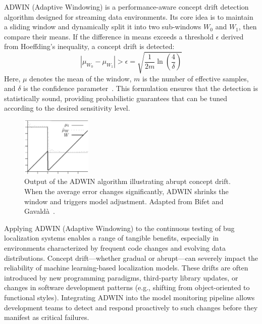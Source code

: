 \documentclass[manuscript,screen,review]{acmart}
\begin{document}
ADWIN (Adaptive Windowing) is a performance-aware concept drift detection algorithm designed for streaming data environments. Its core idea is to maintain a sliding window and dynamically split it into two sub-windows \( W_0 \) and \( W_1 \), then compare their means. If the difference in means exceeds a threshold \( \epsilon \) derived from Hoeffding’s inequality, a concept drift is detected:
\[
\left| \mu_{W_0} - \mu_{W_1} \right| > \epsilon = \sqrt{ \frac{1}{2m} \ln \left( \frac{4}{\delta} \right) }
\]
Here, \( \mu \) denotes the mean of the window, \( m \) is the number of effective samples, and \( \delta \) is the confidence parameter~\cite{Bifet2007}.
This formulation ensures that the detection is statistically sound, providing probabilistic guarantees that can be tuned according to the desired sensitivity level.

\begin{figure}[H]
  \centering
  \includegraphics[width=0.3\textwidth]{picture/5.1fig2.pdf}
  \caption{Output of the ADWIN algorithm illustrating abrupt concept drift. When the average error changes significantly, ADWIN shrinks the window and triggers model adjustment. Adapted from Bifet and Gavaldà~\cite{Bifet2007}.}
  \label{fig:adwin}
\end{figure}

Applying ADWIN (Adaptive Windowing) to the continuous testing of bug localization systems enables a range of tangible benefits, especially in environments characterized by frequent code changes and evolving data distributions. Concept drift---whether gradual or abrupt---can severely impact the reliability of machine learning-based localization models. These drifts are often introduced by new programming paradigms, third-party library updates, or changes in software development patterns (e.g., shifting from object-oriented to functional styles). Integrating ADWIN into the model monitoring pipeline allows development teams to detect and respond proactively to such changes before they manifest as critical failures.
\end{document}
